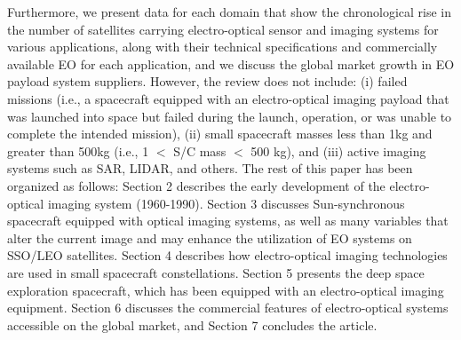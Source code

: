 \documentclass[final,5p,times,sort&compress,twocolumn]{elsarticle}
\begin{document}
Furthermore, we present data for each domain that show the chronological rise in the number of satellites carrying electro-optical sensor and imaging systems for various applications, along with their technical specifications and commercially available EO for each application, and we discuss the global market growth in EO payload system suppliers. However, the review does not include: (i) failed missions (i.e., a spacecraft equipped with an electro-optical imaging payload that was launched into space but failed during the launch, operation, or was unable to complete the intended mission), (ii) small spacecraft masses less than 1kg and greater than 500kg (i.e., 1 $<$ S/C mass $<$ 500 kg), and (iii) active imaging systems such as SAR, LIDAR, and others.  The rest of this paper has been organized as follows:  Section 2 describes the early development of the electro-optical imaging system (1960-1990). Section 3 discusses Sun-synchronous spacecraft equipped with optical imaging systems, as well as many variables that alter the current image and may enhance the utilization of EO systems on SSO/LEO satellites. Section 4 describes how electro-optical imaging technologies are used in small spacecraft constellations.  Section 5 presents the deep space exploration spacecraft, which has been equipped with an electro-optical imaging equipment. Section 6 discusses the commercial features of electro-optical systems accessible on the global market, and Section 7 concludes the article.
\end{document}
